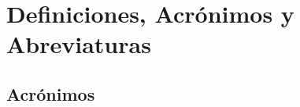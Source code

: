 \documentclass{memoriaPFC}
\begin{document}

\mainmatter













\backmatter


\clearpage
{}
{}
\chapter*{Definiciones, Acrónimos y Abreviaturas}

\section*{Acrónimos}
\label{sec:acronimos}
\end{document}
